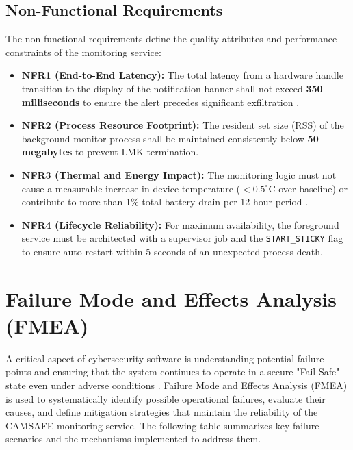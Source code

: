 \documentclass[12pt,a4paper]{report}
\begin{document}
\begin{enumerate}
    \subsection{Non-Functional Requirements}
    The non-functional requirements define the quality attributes and performance constraints of the monitoring service:
    \begin{itemize}
        \item \textbf{NFR1 (End-to-End Latency):} The total latency from a hardware handle transition to the display of the notification banner shall not exceed \textbf{350 milliseconds} to ensure the alert precedes significant exfiltration \cite{androidhal}.
        \item \textbf{NFR2 (Process Resource Footprint):} The resident set size (RSS) of the background monitor process shall be maintained consistently below \textbf{50 megabytes} to prevent LMK termination.
        \item \textbf{NFR3 (Thermal and Energy Impact):} The monitoring logic must not cause a measurable increase in device temperature ($<0.5^\circ$C over baseline) or contribute to more than 1\% total battery drain per 12-hour period \cite{edgecomp}.
        \item \textbf{NFR4 (Lifecycle Reliability):} For maximum availability, the foreground service must be architected with a supervisor job and the \texttt{START\_STICKY} flag to ensure auto-restart within 5 seconds of an unexpected process death.
    \end{itemize}

   \section{Failure Mode and Effects Analysis (FMEA)}

A critical aspect of cybersecurity software is understanding potential failure
points and ensuring that the system continues to operate in a secure
"Fail-Safe" state even under adverse conditions \cite{malwaresurvey}. Failure
Mode and Effects Analysis (FMEA) is used to systematically identify possible
operational failures, evaluate their causes, and define mitigation strategies
that maintain the reliability of the CAMSAFE monitoring service. The following
table summarizes key failure scenarios and the mechanisms implemented to
address them.


\end{enumerate}
\end{document}

